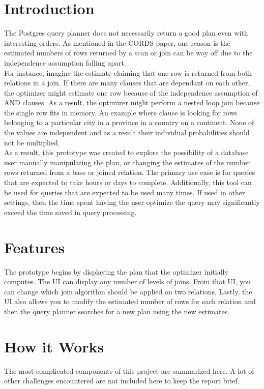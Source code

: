 \documentclass[letterpaper,10pt]{article}
\begin{document}
\raggedright

\setlength{\columnseprule}{0.5pt}


\section{Introduction}
The Postgres query planner does not necessarily return a good plan even with
interesting orders. As mentioned in the CORDS paper, one reason is the estimated
numbers of rows returned by a scan or join can be way off \cite{Ilyas04} due to
the independence assumption falling apart. \\[0.5cm]

For instance, imagine the estimate claiming that one row is returned from both
relations in a join. If there are many clauses that are dependant on each other,
the optimizer might estimate one row because of the independence assumption of
AND clauses. As a result, the optimizer might perform a nested loop join because
the single row fits in memory. An example where clause is looking for rows
belonging to a particular city in a province in a country on a continent. None
of the values are independent and as a result their individual probabilities
should not be multiplied.  \\[0.5cm]

As a result, this prototype was created to explore the possibility of a database
user manually manipulating the plan, or changing the estimates of the number
rows returned from a base or joined relation. The primary use case is for
queries that are expected to take hours or days to complete. Additionally, this
tool can be used for queries that are expected to be used many times. If used in
other settings, then the time spent having the user optimize the query may
significantly exceed the time saved in query processing.

\section{Features}
The prototype begins by displaying the plan that the optimizer initially
computes. The UI can display any number of levels of joins. From that UI, you
can change which join algorithm should be applied on two relations. Lastly, the
UI also allows you to modify the estimated number of rows for each relation
and then the query planner searches for a new plan using the new estimates.

\section{How it Works}
The most complicated components of this project are summarized here. A lot of
other challenges encountered are not included here to keep the report brief.
\end{document}
